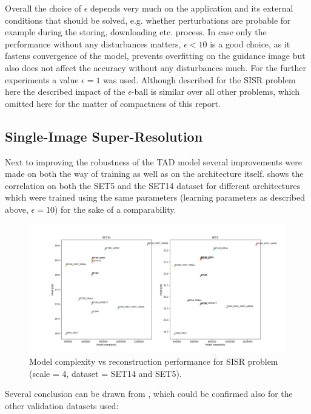 Overall the choice of $\epsilon$ depends very much on the application and its
external conditions that should be solved, e.g. whether perturbations are
probable for example during the storing, downloading etc. process.
In case only the performance without any disturbances matters, $\epsilon < 10$
is a good choice, as it fastens convergence of the model, prevents overfitting
on the guidance image but also does not affect the accuracy without any
disturbances much. For the further experiments a value $\epsilon = 1$ was used.
\newline
Although described for the \ac{SISR} problem here the described impact of
the $\epsilon$-ball is similar over all other problems, which omitted here
for the matter of compactness of this report.

\subsection{Single-Image Super-Resolution}
\label{sec:Experiments_SISR}
Next to improving the robustness of the \ac{TAD} model several improvements
were made on both the way of training as well as on the architecture itself.
 shows the correlation on both the SET5
and the SET14 dataset for different architectures which were trained using the
same parameters (learning parameters as described above, $\epsilon = 10$) for
the sake of a comparability.

\begin{figure}[!htbp]
	\centering
	\includegraphics[width=18cm]{figures/psnr_complexity_sisr}
	\caption{Model complexity vs reconstruction performance for \ac{SISR}
	problem (scale = 4, dataset = SET14 and SET5).}
  \label{fig:psnr_complexty_sisr}
\end{figure}

Several conclusion can be drawn from , which
could be confirmed also for the other validation datasets used:

